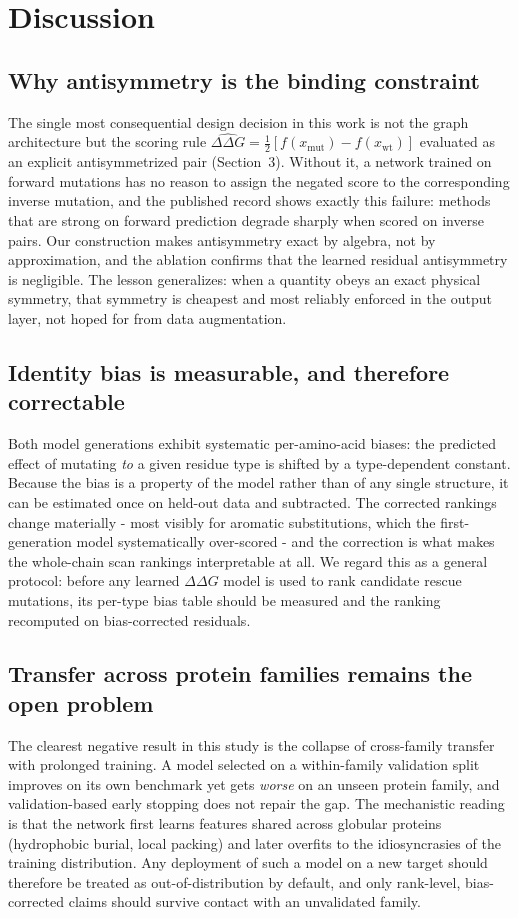 \documentclass[11pt]{article}
\begin{document}
\section{Discussion}
\label{sec:discussion}

\subsection{Why antisymmetry is the binding constraint}
The single most consequential design decision in this work is not the
graph architecture but the scoring rule
$\widehat{\Delta\Delta G} = \tfrac{1}{2}[f(x_{\mathrm{mut}}) -
f(x_{\mathrm{wt}})]$ evaluated as an explicit antisymmetrized pair
(Section~3). Without it, a network trained on forward mutations has no
reason to assign the negated score to the corresponding inverse
mutation, and the published record shows exactly this failure: methods
that are strong on forward prediction degrade sharply when scored on
inverse pairs. Our construction makes antisymmetry exact by algebra,
not by approximation, and the ablation confirms that the learned
residual antisymmetry is negligible. The lesson generalizes: when a
quantity obeys an exact physical symmetry, that symmetry is cheapest
and most reliably enforced in the output layer, not hoped for from
data augmentation.

\subsection{Identity bias is measurable, and therefore correctable}
Both model generations exhibit systematic per-amino-acid biases: the
predicted effect of mutating \emph{to} a given residue type is shifted
by a type-dependent constant. Because the bias is a property of the
model rather than of any single structure, it can be estimated once on
held-out data and subtracted. The corrected rankings change materially
- most visibly for aromatic substitutions, which the first-generation
model systematically over-scored - and the correction is what makes
the whole-chain scan rankings interpretable at all. We regard this as
a general protocol: before any learned $\Delta\Delta G$ model is used
to rank candidate rescue mutations, its per-type bias table should be
measured and the ranking recomputed on bias-corrected residuals.

\subsection{Transfer across protein families remains the open problem}
The clearest negative result in this study is the collapse of
cross-family transfer with prolonged training. A model selected on a
within-family validation split improves on its own benchmark yet gets
\emph{worse} on an unseen protein family, and validation-based early
stopping does not repair the gap. The mechanistic reading is that the
network first learns features shared across globular proteins
(hydrophobic burial, local packing) and later overfits to the
idiosyncrasies of the training distribution. Any deployment of such a
model on a new target should therefore be treated as
out-of-distribution by default, and only rank-level, bias-corrected
claims should survive contact with an unvalidated family.
\end{document}
